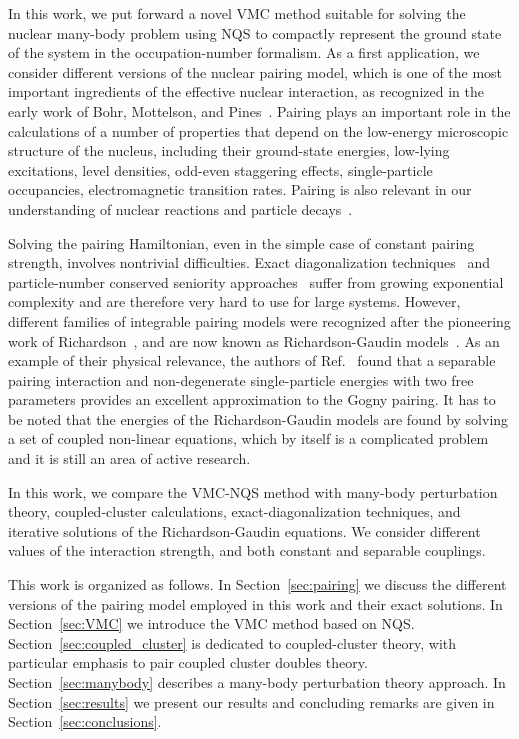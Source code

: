 \documentclass[aps,pre,floatfix,showpacs,twocolumn, preprintnumbers]{revtex4-1}
\begin{document}
In this work, we put forward a novel VMC method suitable for solving the nuclear many-body problem using NQS to compactly represent the ground state of the system in the occupation-number formalism. As a first application, we consider different versions of the nuclear pairing model, which is one of the most important ingredients of the effective nuclear interaction, as recognized in the early work of Bohr, Mottelson, and Pines~\cite{Bohr:1958zz}. Pairing plays an important role in the calculations of a number of properties that depend on the low-energy microscopic structure of the nucleus, including their ground-state energies, low-lying excitations, level densities, odd-even staggering effects, single-particle occupancies, electromagnetic transition rates. Pairing is also relevant in our understanding of nuclear reactions and particle decays~\cite{Dean:2002zx,Moller:1992zz}.

Solving the pairing Hamiltonian, even in the simple case of constant pairing strength, involves nontrivial difficulties. Exact diagonalization techniques~\cite{Molique:1997zz,Volya:2000ne,Zelevinsky:2003ad,Liu:2020mkp} and particle-number conserved seniority approaches~\cite{Sandulescu:1996wq,Jia:2013lea} suffer from growing exponential
complexity and are therefore very hard to use for
large systems. However, different families of integrable pairing models were recognized after the pioneering work of Richardson~\cite{Richardson:1963a,Richardson:1963b}, and are now known as Richardson-Gaudin models~\cite{Gaudin:1976}. As an example of their physical relevance, the authors of Ref.~\cite{Dukelsky:2011nb} found that a separable pairing interaction and non-degenerate single-particle energies with two free parameters provides an excellent approximation to the Gogny pairing. It has to be noted that the energies of the Richardson-Gaudin models are found by solving a set of coupled non-linear equations, which by itself is a complicated problem~\cite{Guan:2022CoPhC} and it is still an area of active research. 

In this work, we compare the VMC-NQS method with many-body perturbation theory, coupled-cluster calculations, exact-diagonalization techniques, and iterative solutions of the Richardson-Gaudin equations. We consider different values of the interaction strength, and both constant and separable couplings. 

This work is organized as follows. In Section~\ref{sec:pairing} we discuss the different versions of the pairing model employed in this work and their exact solutions. In Section~\ref{sec:VMC} we introduce the VMC method based on NQS. Section~\ref{sec:coupled_cluster} is dedicated to coupled-cluster theory, with particular emphasis to pair coupled cluster doubles theory. Section~\ref{sec:manybody} describes a many-body perturbation theory approach. In Section~\ref{sec:results} we present our results and 
concluding remarks are given in Section~\ref{sec:conclusions}. 
\end{document}
